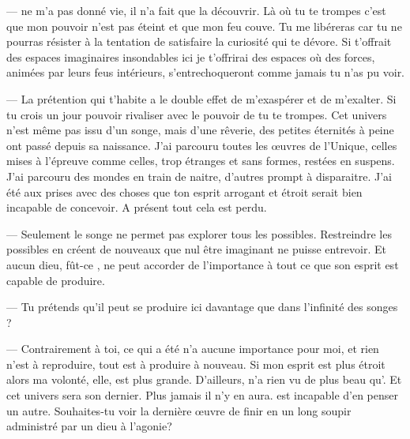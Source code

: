 --- \Mey ne m'a pas donné vie, il n'a fait que la découvrir. Là où tu te trompes c'est que mon pouvoir n'est pas éteint et que mon feu couve. Tu me libéreras car tu ne pourras résister à la tentation de satisfaire la curiosité qui te dévore. Si \Mey t'offrait des espaces imaginaires insondables ici je t'offrirai des espaces où des forces, animées par leurs feus intérieurs, s'entrechoqueront comme jamais tu n'as pu voir.

--- La prétention qui t'habite a le double effet de m'exaspérer et de m'exalter. Si tu crois un jour pouvoir rivaliser avec le pouvoir de \Mey tu te trompes. Cet univers n'est même pas issu d'un songe, mais d'une rêverie, des petites éternités à peine ont passé depuis sa naissance. J'ai parcouru toutes les œuvres de l'Unique, celles mises à l'épreuve comme celles, trop étranges et sans formes, restées en suspens. J'ai parcouru des mondes en train de naitre, d'autres prompt à disparaitre. J'ai été aux prises avec des choses que ton esprit arrogant et étroit serait bien incapable de concevoir. A présent tout cela est perdu.

--- Seulement le songe ne permet pas explorer tous les possibles. Restreindre les possibles en créent de nouveaux que nul être imaginant ne puisse entrevoir. Et aucun dieu, fût-ce \Mey, ne peut accorder de l'importance à tout ce que son esprit est capable de produire.

--- Tu prétends qu'il peut se produire ici davantage que dans l'infinité des songes ? 

--- Contrairement à toi, ce qui a été n'a aucune importance pour moi, et rien n'est à reproduire, tout est à produire à nouveau. Si mon esprit est plus étroit alors ma volonté, elle, est plus grande. D'ailleurs, \Mey n'a rien vu de plus beau qu'\auga. Et cet univers sera son dernier. Plus jamais il n'y en aura. \Cind est incapable d'en penser un autre. Souhaites-tu voir la dernière œuvre de \Mey finir en un long soupir administré par un dieu à l'agonie?

